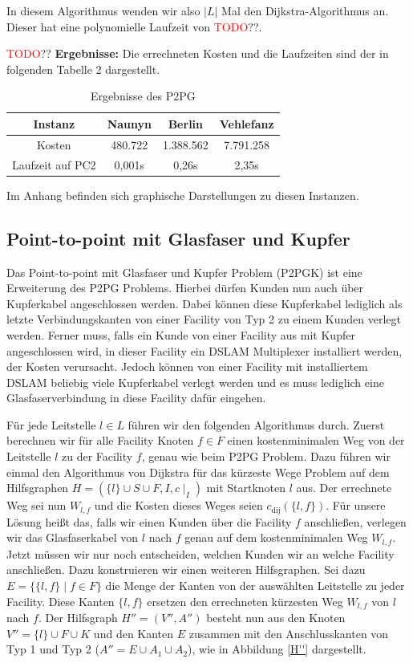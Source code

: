 \documentclass[11pt,a4paper]{article}
\newcommand{\TODO}{\textcolor{red}{TODO}}
\theoremstyle{my_th_style1}
\begin{document}
In diesem Algorithmus wenden wir also $|L|$ Mal den Dijkstra-Algorithmus an.
Dieser hat eine polynomielle Laufzeit von \TODO??. 

\TODO??
\textbf{Ergebnisse:} Die errechneten Kosten und die Laufzeiten sind der in folgenden Tabelle 2 dargestellt.
\begin{table}[h]
	\centering
	\begin{tabular}{c|c|c|c}
		 Instanz & Naunyn & Berlin & Vehlefanz \\	
		\hline
		Kosten & 480.722 & 1.388.562 & 7.791.258 \\
		Laufzeit auf PC2 & 0,001s & 0,26s & 2,35s\\
	\end{tabular}
	\label{P2PG}
	\caption{Ergebnisse des P2PG} 
\end{table}
Im Anhang befinden sich graphische Darstellungen zu diesen Instanzen.



\subsection{Point-to-point mit Glasfaser und Kupfer}
Das Point-to-point mit Glasfaser und Kupfer Problem (P2PGK) ist eine Erweiterung des P2PG Problems.
Hierbei d\"urfen Kunden nun auch \"uber Kupferkabel angeschlossen werden.
Dabei k\"onnen diese Kupferkabel lediglich als letzte Verbindungskanten von einer Facility von Typ 2 zu einem Kunden verlegt werden.
Ferner muss, falls ein Kunde von einer Facility aus mit Kupfer angeschlossen wird, in dieser Facility ein DSLAM Multiplexer installiert werden, der Kosten verursacht.
Jedoch k\"onnen von einer Facility mit installiertem DSLAM beliebig viele Kupferkabel verlegt werden und es muss lediglich eine Glasfaserverbindung in diese Facility daf\"ur eingehen.

Für jede Leitstelle $l \in L$ führen wir den folgenden Algorithmus durch.
Zuerst berechnen wir für alle Facility Knoten $f \in F$ einen kostenminimalen Weg von der Leitstelle $l$ zu der Facility $f$, genau wie beim P2PG Problem. Dazu führen wir einmal den Algorithmus von Dijkstra für das kürzeste Wege Problem auf dem Hilfsgraphen $H=(\{l\} \cup S \cup F , I,c\mid_I)$ mit Startknoten $l$ aus. Der errechnete Weg sei nun $W_{l,f}$ und die Kosten dieses Weges seien $c_{\text{dij}}(\{l,f\})$.
Für unsere Lösung heißt das, falls wir einen Kunden über die Facility $f$ anschließen, verlegen wir das Glasfaserkabel von $l$ nach $f$ genau auf dem kostenminimalen Weg $W_{l,f}$.  Jetzt müssen wir nur noch entscheiden, welchen Kunden wir an welche Facility anschließen.
Dazu konstruieren wir einen weiteren Hilfsgraphen. Sei dazu $E=\{\{l,f  \} \mid f \in F  \}$ die Menge der Kanten von der auswählten Leitstelle zu jeder Facility. Diese Kanten $\{l,f\}$ ersetzen den errechneten kürzesten Weg $W_{l,f}$ von $l$ nach $f$. Der Hilfsgraph $H''=(V'',A'')$ besteht nun aus den Knoten $V''=\{l\} \cup F \cup K$ und den Kanten $E$ zusammen mit den Anschlusskanten von Typ 1 und Typ 2 ($A''=E \cup A_1 \cup A_2$), wie in Abbildung \ref{H''} dargestellt.
\end{document}
